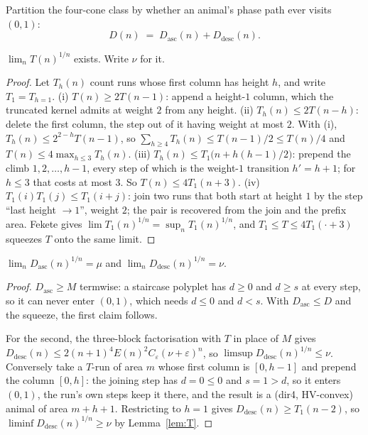 \documentclass[11pt]{article}
\begin{document}
Partition the four-cone class by whether an animal's phase path ever visits
$(0,1)$:
\[
  D(n) \;=\; D_{\mathrm{asc}}(n) + D_{\mathrm{desc}}(n).
\]

\begin{lemma}
\label{lem:T}
$\lim_n T(n)^{1/n}$ exists. Write $\nu$ for it.
\end{lemma}

\begin{proof}
Let $T_h(n)$ count runs whose first column has height $h$, and write
$T_1 = T_{h=1}$.
(i) $T(n) \ge 2T(n{-}1)$: append a height-$1$ column, which the truncated kernel
admits at weight $2$ from any height.
(ii) $T_h(n) \le 2T(n{-}h)$: delete the first column, the step out of it having
weight at most $2$. With (i), $T_h(n) \le 2^{2-h}T(n{-}1)$, so
$\sum_{h\ge4}T_h(n) \le T(n{-}1)/2 \le T(n)/4$ and
$T(n) \le 4\max_{h\le3}T_h(n)$.
(iii) $T_h(n) \le T_1\bigl(n + h(h{-}1)/2\bigr)$: prepend the climb
$1,2,\dots,h{-}1$, every step of which is the weight-$1$ transition $h' = h+1$;
for $h \le 3$ that costs at most $3$. So $T(n) \le 4T_1(n{+}3)$.
(iv) $T_1(i)T_1(j) \le T_1(i{+}j)$: join two runs that both start at height $1$
by the step ``last height $\to 1$'', weight $2$; the pair is recovered from the
join and the prefix area.
Fekete gives $\lim T_1(n)^{1/n} = \sup_n T_1(n)^{1/n}$, and
$T_1 \le T \le 4T_1(\cdot{+}3)$ squeezes $T$ onto the same limit.
\end{proof}

\begin{proposition}
\label{prop:split}
$\lim_n D_{\mathrm{asc}}(n)^{1/n} = \mu$ and
$\lim_n D_{\mathrm{desc}}(n)^{1/n} = \nu$.
\end{proposition}

\begin{proof}
$D_{\mathrm{asc}} \ge M$ termwise: a staircase polyplet has $d \ge 0$ and
$d \ge s$ at every step, so it can never enter $(0,1)$, which needs $d \le 0$
and $d < s$. With $D_{\mathrm{asc}} \le D$ and the squeeze, the first claim follows.

For the second, the three-block factorisation with $T$ in place of $M$
gives $D_{\mathrm{desc}}(n) \le 2(n{+}1)^4E(n)^2C_\varepsilon(\nu+\varepsilon)^n$,
so $\limsup D_{\mathrm{desc}}(n)^{1/n} \le \nu$. Conversely take a $T$-run of
area $m$ whose first column is $[0,h{-}1]$ and prepend the column $[0,h]$: the
joining step has $d = 0 \le 0$ and $s = 1 > d$, so it enters $(0,1)$, the run's
own steps keep it there, and the result is a (dir4, HV-convex) animal of area
$m + h + 1$. Restricting to $h = 1$ gives $D_{\mathrm{desc}}(n) \ge T_1(n{-}2)$,
so $\liminf D_{\mathrm{desc}}(n)^{1/n} \ge \nu$ by Lemma~\ref{lem:T}.
\end{proof}
\end{document}
